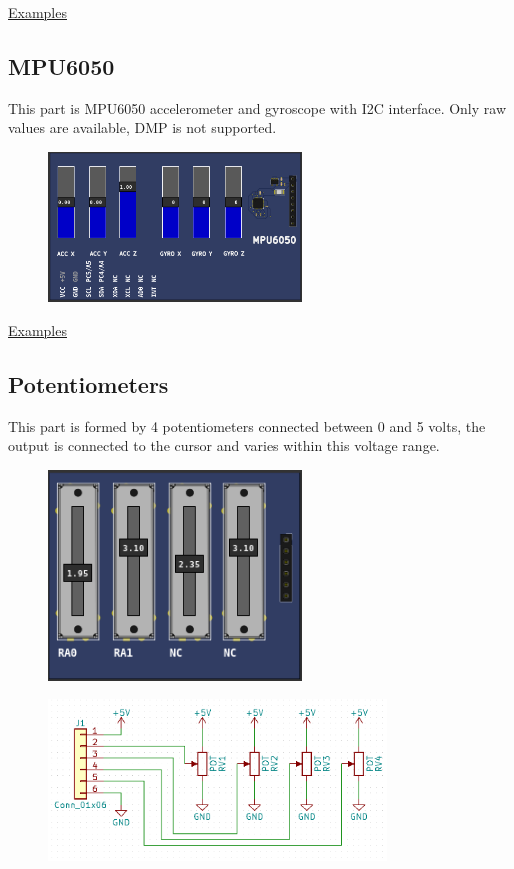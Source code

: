 \href{https://lcgamboa.github.io/picsimlab_examples/parts_LM35_(Temperature).html}{Examples}


\subsection{MPU6050}

This part is MPU6050 accelerometer and gyroscope with I2C interface. 
Only raw values are available, DMP is not supported.

\begin{figure}[H]
\center
\includegraphics[width=0.6\textwidth]{img/part_mpu6050.png} 
\end{figure} 


\href{https://lcgamboa.github.io/picsimlab_examples/parts_MPU6050.html}{Examples}

\subsection{Potentiometers}

This part is formed by 4 potentiometers connected between 0 and 5 volts, the output is connected to the cursor and varies within this voltage range.
\begin{figure}[H]
\center
\includegraphics[width=0.6\textwidth]{img/part_pot.png} 
\end{figure} 

\begin{figure}[H]
\center
\includegraphics[width=0.8\textwidth]{img/part_pot_.png} 
\end{figure} 


